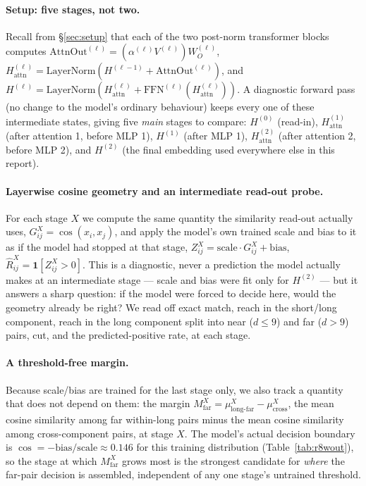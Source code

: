 \documentclass[11pt,a4paper]{article}
\begin{document}
\paragraph{Setup: five stages, not two.} Recall from \S\ref{sec:setup} that
each of the two post-norm transformer blocks computes
$\mathrm{AttnOut}^{(\ell)}=(\alpha^{(\ell)}V^{(\ell)})W_O^{(\ell)}$,
$H_{\mathrm{attn}}^{(\ell)}=\mathrm{LayerNorm}(H^{(\ell-1)}+\mathrm{AttnOut}^{(\ell)})$,
and $H^{(\ell)}=\mathrm{LayerNorm}(H_{\mathrm{attn}}^{(\ell)}+\mathrm{FFN}^{(\ell)}(H_{\mathrm{attn}}^{(\ell)}))$.
A diagnostic forward pass (no change to the model's ordinary behaviour) keeps
every one of these intermediate states, giving five \emph{main} stages to
compare: $H^{(0)}$ (read-in), $H_{\mathrm{attn}}^{(1)}$ (after attention 1,
before MLP 1), $H^{(1)}$ (after MLP 1), $H_{\mathrm{attn}}^{(2)}$ (after
attention 2, before MLP 2), and $H^{(2)}$ (the final embedding used
everywhere else in this report).

\paragraph{Layerwise cosine geometry and an intermediate read-out probe.} For
each stage $X$ we compute the same quantity the similarity read-out actually
uses, $G^X_{ij}=\cos(x_i,x_j)$, and apply the model's own trained scale and
bias to it as if the model had stopped at that stage,
$Z^X_{ij}=\mathrm{scale}\cdot G^X_{ij}+\mathrm{bias}$,
$\hat R^X_{ij}=\mathbf 1[Z^X_{ij}>0]$. This is a diagnostic, never a
prediction the model actually makes at an intermediate stage --- scale and
bias were fit only for $H^{(2)}$ --- but it answers a sharp question: if the
model were forced to decide here, would the geometry already be right? We
read off exact match, reach in the short/long component, reach in the long
component split into near ($d\le9$) and far ($d>9$) pairs, cut, and the
predicted-positive rate, at each stage.

\paragraph{A threshold-free margin.} Because scale/bias are trained for the
last stage only, we also track a quantity that does not depend on them: the
margin $M_{\mathrm{far}}^X=\mu_{\mathrm{long\text{-}far}}^X-\mu_{\mathrm{cross}}^X$,
the mean cosine similarity among far within-long pairs minus the mean cosine
similarity among cross-component pairs, at stage $X$. The model's actual
decision boundary is $\cos=-\mathrm{bias}/\mathrm{scale}\approx0.146$ for this
training distribution (Table~\ref{tab:r8wout}), so the stage at which
$M_{\mathrm{far}}^X$ grows most is the strongest candidate for \emph{where}
the far-pair decision is assembled, independent of any one stage's untrained
threshold.
\end{document}
